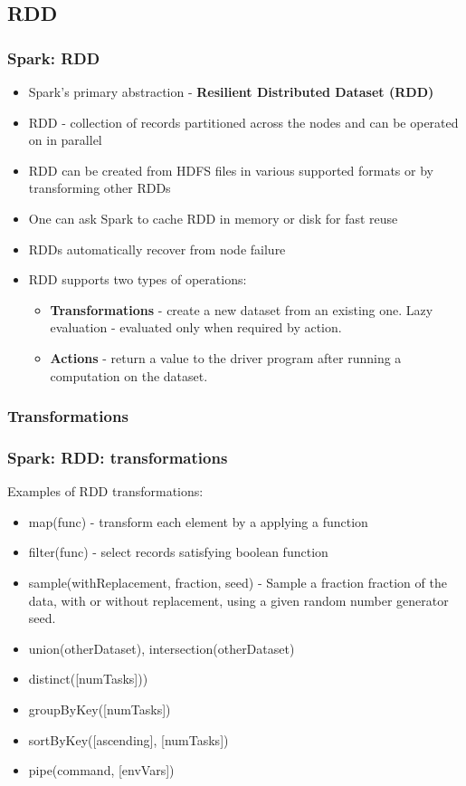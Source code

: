 \documentclass{beamer}
\begin{document}
\subsection{RDD}
\begin{frame}
 \frametitle{Spark: RDD}
 \begin{itemize}
  \item Spark's primary abstraction - {\color{mycolordef}\textbf{Resilient Distributed Dataset (RDD)}}
  \item RDD - collection of records partitioned across the nodes and can be operated on in parallel
  \item RDD can be created from HDFS files in various supported formats or by transforming other RDDs
  \item One can ask Spark to {\color{mycolordef}cache RDD in memory or disk} for fast reuse
  \item RDDs automatically recover from node failure
  \item RDD supports two types of operations:
    \begin{itemize}
      \item {\color{mycolordef}\textbf{Transformations}} - create a new dataset from an existing one. Lazy evaluation - evaluated only when required by action.
      \item {\color{mycolordef}\textbf{Actions}} - return a value to the driver program after running a computation on the dataset.
    \end{itemize}
 \end{itemize}
\end{frame}

\subsubsection{Transformations}
\begin{frame}
  \frametitle{Spark: RDD: transformations}
  Examples of RDD transformations:
  \begin{itemize}
  \item {\color{mycolorcode}map(func)} - transform each element by a applying a function
  \item {\color{mycolorcode}filter(func)} - select records satisfying boolean function
  \item {\color{mycolorcode}sample(withReplacement, fraction, seed)} - Sample a fraction fraction of the data, with or without replacement, using a given random number generator seed.
  \item {\color{mycolorcode}union(otherDataset), intersection(otherDataset)}
  \item {\color{mycolorcode}distinct([numTasks]))}
  \item {\color{mycolorcode}groupByKey([numTasks])}
  \item {\color{mycolorcode}sortByKey([ascending], [numTasks])}
  \item {\color{mycolorcode}pipe(command, [envVars])}
  \end{itemize}
\end{frame}
\end{document}
